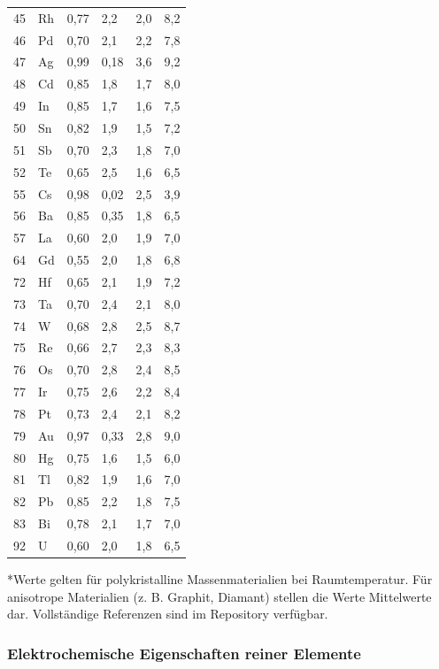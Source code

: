 \documentclass[12pt,a4paper]{article}
\begin{document}
\begin{longtable}{p{0.8cm}p{1.2cm}p{2.2cm}p{2.2cm}p{2.2cm}p{2.2cm}}
		45 & Rh & 0,77 & 2,2 & 2,0 & 8,2 \\
		46 & Pd & 0,70 & 2,1 & 2,2 & 7,8 \\
		47 & Ag & 0,99 & 0,18 & 3,6 & 9,2 \\
		48 & Cd & 0,85 & 1,8 & 1,7 & 8,0 \\
		49 & In & 0,85 & 1,7 & 1,6 & 7,5 \\
		50 & Sn & 0,82 & 1,9 & 1,5 & 7,2 \\
		51 & Sb & 0,70 & 2,3 & 1,8 & 7,0 \\
		52 & Te & 0,65 & 2,5 & 1,6 & 6,5 \\
		55 & Cs & 0,98 & 0,02 & 2,5 & 3,9 \\
		56 & Ba & 0,85 & 0,35 & 1,8 & 6,5 \\
		57 & La & 0,60 & 2,0 & 1,9 & 7,0 \\
		64 & Gd & 0,55 & 2,0 & 1,8 & 6,8 \\
		72 & Hf & 0,65 & 2,1 & 1,9 & 7,2 \\
		73 & Ta & 0,70 & 2,4 & 2,1 & 8,0 \\
		74 & W  & 0,68 & 2,8 & 2,5 & 8,7 \\
		75 & Re & 0,66 & 2,7 & 2,3 & 8,3 \\
		76 & Os & 0,70 & 2,8 & 2,4 & 8,5 \\
		77 & Ir & 0,75 & 2,6 & 2,2 & 8,4 \\
		78 & Pt & 0,73 & 2,4 & 2,1 & 8,2 \\
		79 & Au & 0,97 & 0,33 & 2,8 & 9,0 \\
		80 & Hg & 0,75 & 1,6 & 1,5 & 6,0 \\
		81 & Tl & 0,82 & 1,9 & 1,6 & 7,0 \\
		82 & Pb & 0,85 & 2,2 & 1,8 & 7,5 \\
		83 & Bi & 0,78 & 2,1 & 1,7 & 7,0 \\
		92 & U  & 0,60 & 2,0 & 1,8 & 6,5 \\
		\bottomrule
	\end{longtable}
	*Werte gelten für polykristalline Massenmaterialien bei Raumtemperatur. Für anisotrope Materialien (z. B. Graphit, Diamant) stellen die Werte Mittelwerte dar. Vollständige Referenzen sind im Repository verfügbar.
	
	\subsubsection{Elektrochemische Eigenschaften reiner Elemente}
	\label{subsec:electrochemical-properties-func}
	
\end{document}
